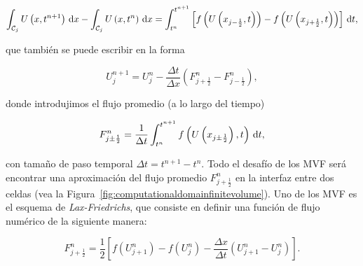 \begin{frame}
	\begin{equation*}
		\int_{\mathcal{C}_{j}}
		U
		\left(x,t^{n+1}\right)
		\dl x-
		\int_{\mathcal{C}_{j}}
		U
		\left(x,t^{n}\right)
		\dl x=
		\int_{t^{n}}^{t^{n+1}}
		\left[
			f\left(U\left(x_{j-\frac{1}{2}},t\right)\right)-
			f\left(U\left(x_{j+\frac{1}{2}},t\right)\right)
			\right]\dl t,
	\end{equation*}

	que también se puede escribir en la forma

	\begin{equation*}
		\boxed{
			U^{n+1}_{j}=
			U^{n}_{j}-
			\frac{\Delta t}{\Delta x}
			\left(
			F^{n}_{j+\frac{1}{2}}-
			F^{n}_{j-\frac{1}{2}}
			\right),
		}
	\end{equation*}

	donde introdujimos el flujo promedio (a lo largo del tiempo)

	\begin{equation*}
		F^{n}_{j\pm\frac{1}{2}}=
		\frac{1}{\Delta t}
		\int_{t^{n}}^{t^{n+1}}
		f\left(U\left(x_{j\pm\frac{1}{2}}\right),t\right)
		\dl t,
	\end{equation*}

	con tamaño de paso temporal $\Delta t=t^{n+1}-t^{n}$.
	Todo el desafío de los MVF será encontrar una aproximación del flujo
	promedio
	\begin{math}
		F^{n}_{j+\frac{1}{2}}
	\end{math}
	en la interfaz entre dos celdas (vea la
	Figura~\ref{fig:computationaldomainfinitevolume}).
	Uno de los MVF es el esquema de \emph{Lax-Friedrichs}, que consiste
	en definir una función de flujo numérico de la siguiente manera:

	\begin{equation*}
		F^{n}_{j+\frac{1}{2}}=
		\frac{1}{2}
		\left[
			f\left(U^{n}_{j+1}\right)-
			f\left(U^{n}_{j}\right)-
			\frac{\Delta x}{\Delta t}
			\left(
			U^{n}_{j+1}-
			U^{n}_{j}
			\right)
			\right].
	\end{equation*}
\end{frame}

